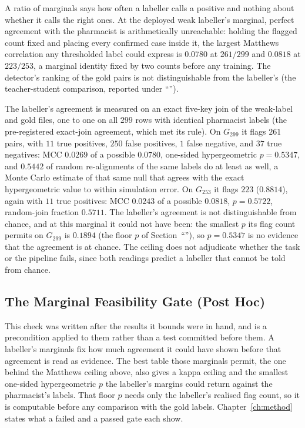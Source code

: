 A ratio of marginals says how often a labeller calls a positive and nothing
about whether it calls the right ones. At the deployed weak labeller's
marginal, perfect agreement with the pharmacist is arithmetically unreachable:
holding the flagged count fixed and placing every confirmed case inside it, the
largest Matthews correlation any thresholded label could express is $0.0780$
at $261/299$ and $0.0818$ at $223/253$, a marginal identity fixed by two counts
before any training. The detector's ranking of the gold pairs is not distinguishable from the labeller's (the
teacher-student comparison, reported under ``'').

The labeller's agreement is measured on an exact five-key join of the
weak-label and gold files, one to one on all $299$ rows with identical
pharmacist labels (the pre-registered exact-join agreement, which met its rule). On $G_{299}$ it flags
$261$ pairs, with $11$ true positives, $250$ false positives, $1$ false negative,
and $37$ true negatives: MCC $0.0269$ of a possible $0.0780$, one-sided
hypergeometric $p = 0.5347$, and $0.5442$ of random re-alignments of the same
labels do at least as well, a Monte Carlo estimate of that same null that
agrees with the exact hypergeometric value to within simulation error. On $G_{253}$ it flags $223$ ($0.8814$), again with
$11$ true positives: MCC $0.0243$ of a possible $0.0818$, $p = 0.5722$,
random-join fraction $0.5711$. The labeller's agreement is not distinguishable from chance, and at this
marginal it could not have been: the smallest $p$ its flag count permits on
$G_{299}$ is $0.1894$ (the floor $p$ of Section~``''), so
$p = 0.5347$ is no evidence that the agreement is at chance. The ceiling does not adjudicate whether the task or the pipeline fails, since both readings
predict a labeller that cannot be told from chance.

\subsection{The Marginal Feasibility Gate (Post Hoc)}
\label{sec:r-feasgate}

This check was written after the results it bounds were in hand, and is a
precondition applied to them rather than a test committed before them. A
labeller's marginals fix how much agreement it could have shown before
that agreement is read as evidence. The best table those marginals permit, the
one behind the Matthews ceiling above, also gives a kappa ceiling and the
smallest one-sided hypergeometric $p$ the labeller's margins could return
against the pharmacist's labels. That floor $p$ needs only the labeller's realised flag count, so it is computable before any
comparison with the gold labels. Chapter~\ref{ch:method} states what a failed and a passed
gate each show.


